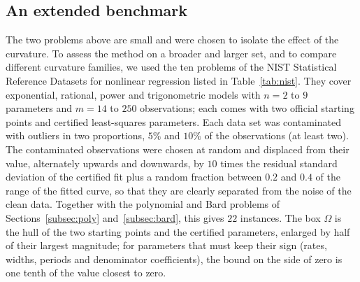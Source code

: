 \documentclass[11pt]{article}
\begin{document}
\subsection{An extended benchmark} \label{subsec:bench}

The two problems above are small and were chosen to isolate the effect of the
curvature. To assess the method on a broader and larger set, and to compare
different curvature families, we used the ten problems of the NIST Statistical
Reference Datasets for nonlinear regression \cite{nist} listed in
Table~\ref{tab:nist}. They cover exponential, rational, power and
trigonometric models
with $n = 2$ to $9$ parameters and $m = 14$ to $250$ observations; each comes
with two official starting points and certified least-squares parameters. Each
data set was contaminated with outliers in two proportions, $5\%$ and $10\%$
of the observations (at least two). The contaminated observations were chosen
at random and displaced from their value, alternately upwards and downwards, by
$10$ times the residual standard deviation of the certified fit plus a random
fraction between $0.2$ and $0.4$ of the range of the fitted curve, so that
they are clearly separated from the noise of the clean data. Together with the
polynomial and Bard problems of Sections~\ref{subsec:poly}
and~\ref{subsec:bard}, this gives $22$ instances. The box $\Omega$ is the hull
of the two starting points and the certified parameters, enlarged by half of
their largest magnitude; for parameters that must keep their sign (rates,
widths, periods and denominator coefficients), the bound on the side of zero
is one tenth of the value closest to zero.
\end{document}

